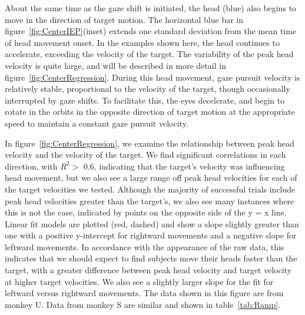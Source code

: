 \documentclass[12pt]{article}
\begin{document}
About the same time as the gaze shift is initiated, the head (blue) also begins to move in the direction of target motion. The horizontal blue bar in figure~\ref{fig:CenterIEP}(inset) extends one standard deviation from the mean time of head movement onset. In the examples shown here, the head continues to accelerate, exceeding the velocity of the target. The variability of the peak head velocity is quite large, and will be described in more detail in figure~\ref{fig:CenterRegression}. During this head movement, gaze pursuit velocity is relatively stable, proportional to the velocity of the target, though occasionally interrupted by gaze shifts. To facilitate this, the eyes decelerate, and begin to rotate in the orbits in the opposite direction of target motion at the appropriate speed to maintain a constant gaze pursuit velocity.  

In figure~\ref{fig:CenterRegression}, we examine the relationship between peak head velocity and the velocity of the target. We find significant correlations in each direction, with $R^{2}>$ 0.6, indicating that the target’s velocity was influencing head movement, but we also see a large range off peak head velocities for each of the target velocities we tested. Although the majority of successful trials include peak head velocities greater than the target’s, we also see many instances where this is not the case, indicated by points on the opposite side of the y = x line. Linear fit models are plotted (red, dashed) and show a slope slightly greater than one with a positive y-intercept for rightward movements and a negative slope for leftward movements. In accordance with the appearance of the raw data, this indicates that we should expect to find subjects move their heads faster than the target, with a greater difference between peak head velocity and target velocity at higher target velocities. We also see a slightly larger slope for the fit for leftward versus rightward movements. The data shown in this figure are from monkey U. Data from monkey S are similar and shown in table~\ref{tab:Ramp}. 
\end{document}
